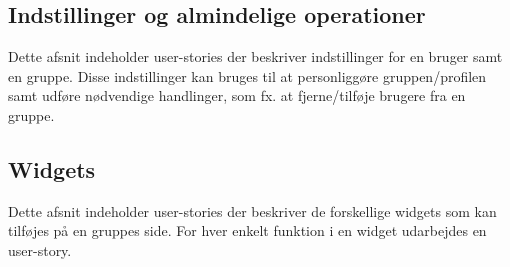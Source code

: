 

\subsection{Indstillinger og almindelige operationer}
Dette afsnit indeholder user-stories der beskriver indstillinger for en bruger samt en gruppe. Disse indstillinger kan bruges til at personliggøre gruppen/profilen samt udføre nødvendige handlinger, som fx. at fjerne/tilføje brugere fra en gruppe.


\subsection{Widgets}
Dette afsnit indeholder user-stories der beskriver de forskellige widgets som kan tilføjes på en gruppes side. For hver enkelt funktion i en widget udarbejdes en user-story. 





